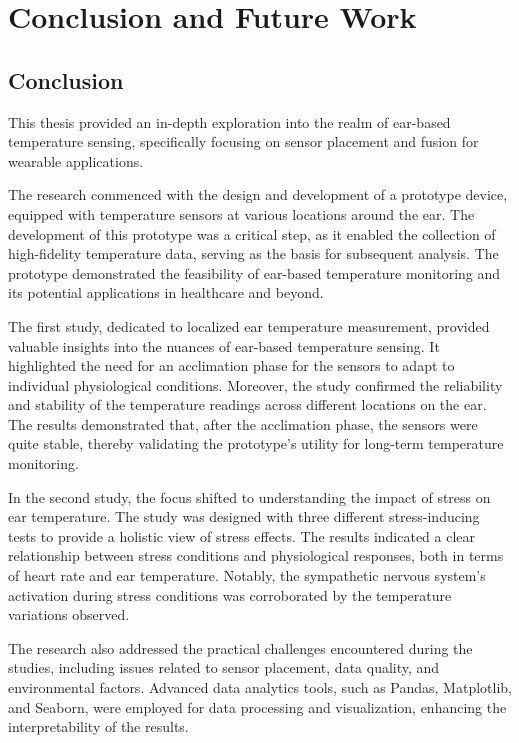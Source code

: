 \chapter{Conclusion and Future Work}
\label{ch:Conclusion}

\section{Conclusion}
This thesis provided an in-depth exploration into the realm of ear-based temperature sensing, specifically focusing on sensor placement and fusion for wearable applications. 

The research commenced with the design and development of a prototype device, equipped with temperature sensors at various locations around the ear. 
The development of this prototype was a critical step, as it enabled the collection of high-fidelity temperature data, serving as the basis for subsequent analysis. 
The prototype demonstrated the feasibility of ear-based temperature monitoring and its potential applications in healthcare and beyond.

The first study, dedicated to localized ear temperature measurement, provided valuable insights into the nuances of ear-based temperature sensing. 
It highlighted the need for an acclimation phase for the sensors to adapt to individual physiological conditions. 
Moreover, the study confirmed the reliability and stability of the temperature readings across different locations on the ear. 
The results demonstrated that, after the acclimation phase, the sensors were quite stable, thereby validating the prototype's utility for long-term temperature monitoring.

In the second study, the focus shifted to understanding the impact of stress on ear temperature. 
The study was designed with three different stress-inducing tests to provide a holistic view of stress effects. 
The results indicated a clear relationship between stress conditions and physiological responses, both in terms of heart rate and ear temperature. 
Notably, the sympathetic nervous system's activation during stress conditions was corroborated by the temperature variations observed. 

The research also addressed the practical challenges encountered during the studies, including issues related to sensor placement, data quality, and environmental factors. 
Advanced data analytics tools, such as Pandas, Matplotlib, and Seaborn, were employed for data processing and visualization, enhancing the interpretability of the results.

